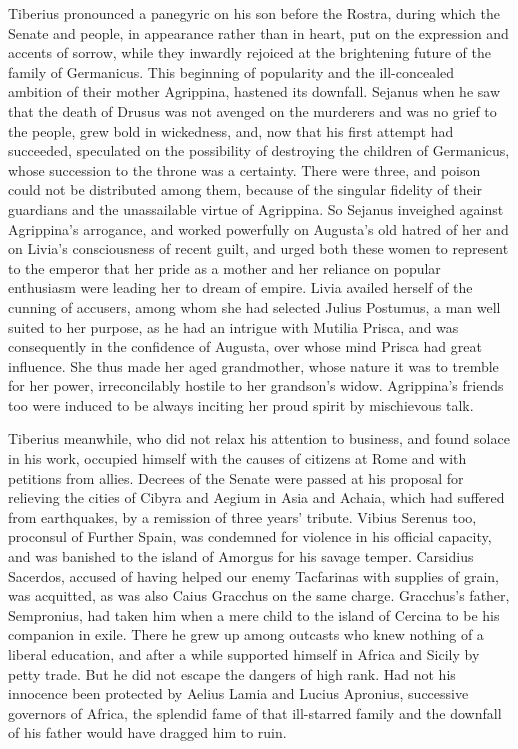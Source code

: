 
Tiberius pronounced a panegyric on his son before the Rostra, during which the Senate and people, in appearance rather than in heart, put on the expression and accents of sorrow, while they inwardly rejoiced at the brightening future of the family of Germanicus. This beginning of popularity and the ill-concealed ambition of their mother Agrippina, hastened its downfall. Sejanus when he saw that the death of Drusus was not avenged on the murderers and was no grief to the people, grew bold in wickedness, and, now that his first attempt had succeeded, speculated on the possibility of destroying the children of Germanicus, whose succession to the throne was a certainty. There were three, and poison could not be distributed among them, because of the singular fidelity of their guardians and the unassailable virtue of Agrippina. So Sejanus inveighed against Agrippina's arrogance, and worked powerfully on Augusta's old hatred of her and on Livia's consciousness of recent guilt, and urged both these women to represent to the emperor that her pride as a mother and her reliance on popular enthusiasm were leading her to dream of empire. Livia availed herself of the cunning of accusers, among whom she had selected Julius Postumus, a man well suited to her purpose, as he had an intrigue with Mutilia Prisca, and was consequently in the confidence of Augusta, over whose mind Prisca had great influence. She thus made her aged grandmother, whose nature it was to tremble for her power, irreconcilably hostile to her grandson's widow. Agrippina's friends too were induced to be always inciting her proud spirit by mischievous talk.


Tiberius meanwhile, who did not relax his attention to business, and found solace in his work, occupied himself with the causes of citizens at Rome and with petitions from allies. Decrees of the Senate were passed at his proposal for relieving the cities of Cibyra and Aegium in Asia and Achaia, which had suffered from earthquakes, by a remission of three years' tribute. Vibius Serenus too, proconsul of Further Spain, was condemned for violence in his official capacity, and was banished to the island of Amorgus for his savage temper. Carsidius Sacerdos, accused of having helped our enemy Tacfarinas with supplies of grain, was acquitted, as was also Caius Gracchus on the same charge. Gracchus's father, Sempronius, had taken him when a mere child to the island of Cercina to be his companion in exile. There he grew up among outcasts who knew nothing of a liberal education, and after a while supported himself in Africa and Sicily by petty trade. But he did not escape the dangers of high rank. Had not his innocence been protected by Aelius Lamia and Lucius Apronius, successive governors of Africa, the splendid fame of that ill-starred family and the downfall of his father would have dragged him to ruin.

